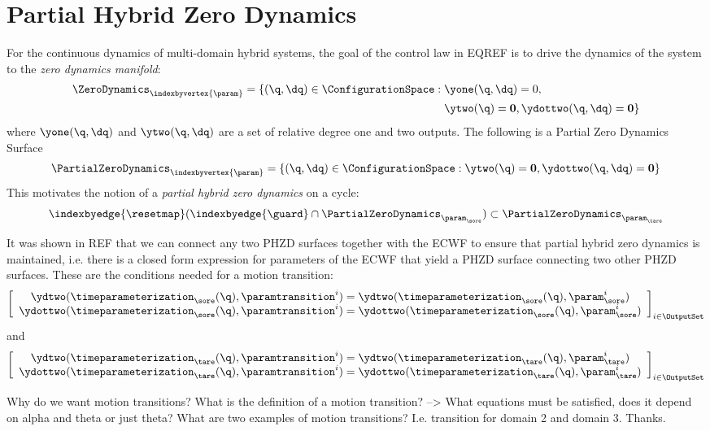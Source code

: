\section{Partial Hybrid Zero Dynamics}
For the continuous dynamics of multi-domain hybrid systems, the goal of the control law in EQREF is to drive the dynamics of the system to the 
\textit{zero dynamics manifold}:
\begin{align}
 \nonumber
\ZeroDynamics_{\indexbyvertex{\param}} = \{(\q,\dq) \in \ConfigurationSpace :  \hspace{1mm} &\yone(\q,\dq) = 0, \\&
\ytwo(\q) = \mathbf{0}, \ydottwo(\q,\dq) = \mathbf{0}\}
\label{eq:ZD}
\end{align}
where $\yone(\q,\dq)$ and $\ytwo(\q,\dq)$ are a set of relative degree one and two outputs. The following is a Partial Zero Dynamics Surface
\begin{align}
\label{PZD}
\PartialZeroDynamics_{\indexbyvertex{\param}} = \{(\q,\dq) \in \ConfigurationSpace : \ytwo(\q) = \mathbf{0}, \ydottwo(\q,\dq) = \mathbf{0}\}
\end{align}
This motivates the notion of a \textit{partial hybrid zero dynamics} on a cycle:
\begin{align}
\label{PZD}
\indexbyedge{\resetmap} ( \indexbyedge{\guard} \cap \PartialZeroDynamics_{\param_\sore} ) \subset \PartialZeroDynamics_{\param_\tare}
\end{align}

 It was shown in REF that we can connect any two PHZD surfaces together with the ECWF to ensure that partial hybrid zero dynamics is maintained, i.e. there is a closed form expression for parameters of the ECWF that yield a PHZD surface connecting two other PHZD surfaces. These are the conditions needed for a motion transition:
\begin{align}
 \left[ \begin{array} {c} \ydtwo(\timeparameterization_{\sore}(\q),\paramtransition^i) = \ydtwo(\timeparameterization_{\sore}(\q),\param_{\sore}^i) \\
 \ydottwo(\timeparameterization_{\sore}(\q),\paramtransition^i) =\ydottwo(\timeparameterization_{\sore}(\q),\param_{\sore}^i)\end{array} \right]_{i \in \OutputSet}
\end{align}
and
\begin{align}
 \left[ \begin{array} {c} \ydtwo(\timeparameterization_{\tare}(\q),\paramtransition^i) = \ydtwo(\timeparameterization_{\tare}(\q),\param_{\tare}^i) \\
 \ydottwo(\timeparameterization_{\tare}(\q),\paramtransition^i) =\ydottwo(\timeparameterization_{\tare}(\q),\param_{\tare}^i)\end{array} \right]_{i \in \OutputSet}
\end{align}




Why do we want motion transitions? What is the definition of a motion transition? --> What equations must be satisfied, does it depend on alpha and theta or just theta? What are two examples of motion transitions? I.e. transition for domain 2 and domain 3. Thanks.


